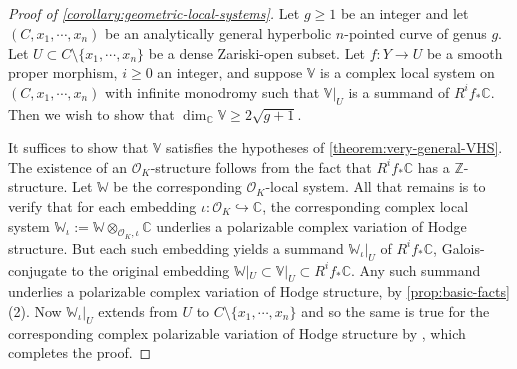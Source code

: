 \documentclass[12 pt]{amsart}
\theoremstyle{plain}
\theoremstyle{definition}
\theoremstyle{remark}
\numberwithin{equation}{section}
\begin{document}
\subsection{}\label{subsubsection:geometric-origin-proof}
\begin{proof}[Proof of \autoref{corollary:geometric-local-systems}]
Let $g\geq 1$ be an integer and let $(C, x_1, \cdots, x_n)$ be an analytically
general hyperbolic $n$-pointed curve of genus $g$. Let $U\subset C\setminus\{x_1, \cdots, x_n\}$ be a dense Zariski-open subset. Let $f: Y\to U$ be a smooth proper morphism, $i\geq 0$ an integer, and suppose $\mathbb{V}$ is a complex local system on $(C, x_1, \cdots, x_n)$ with infinite monodromy such that $\mathbb{V}|_U$ is a summand of $R^if_*\mathbb{C}$. Then we wish to show that $\dim_{\mathbb{C}}\mathbb{V}\geq 2\sqrt{g+1}$.

It suffices to show that $\mathbb{V}$ satisfies the hypotheses of
\autoref{theorem:very-general-VHS}. The existence of an
$\mathscr{O}_K$-structure follows from the fact that $R^if_*\mathbb{C}$ has a
$\mathbb{Z}$-structure. 
Let $\mathbb{W}$ be the corresponding $\mathscr{O}_K$-local system. All that remains is to verify that for each embedding
$\iota:\mathscr{O}_K\hookrightarrow \mathbb{C}$, the corresponding complex local
system $\mathbb{W}_\iota:=\mathbb{W}\otimes_{\mathscr{O}_K, \iota} \mathbb{C}$
underlies a polarizable complex variation of Hodge structure. But  each such
embedding yields a summand $\mathbb{W}_\iota|_U$ of $R^if_*\mathbb{C}$,
Galois-conjugate to the original embedding $\mathbb{W}|_U\subset
\mathbb{V}|_U\subset R^if_*\mathbb{C}.$ Any such summand underlies a polarizable
complex variation of Hodge structure, by \autoref{prop:basic-facts}(2). Now
$\mathbb{W}_\iota|_U$ extends from $U$ to $C\setminus \{x_1, \cdots, x_n\}$ and
so the same is true for the corresponding complex polarizable variation of Hodge
structure by \cite[Corollary 4.11]{schmid1973variation}, which completes the proof.
\end{proof}
\end{document}
